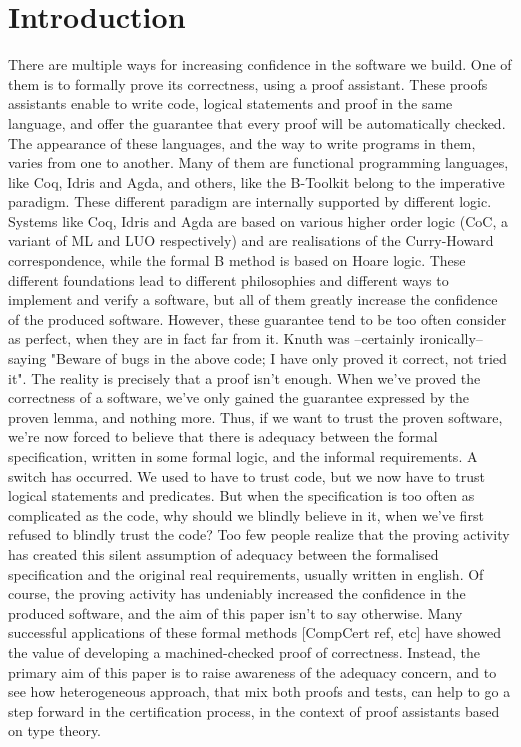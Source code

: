 \section{Introduction}

There are multiple ways for increasing confidence in the software we build. One of them is to formally prove its correctness, using a proof assistant. These proofs assistants enable to write code, logical statements and proof in the same language, and offer the guarantee that every proof will be automatically checked. The appearance of these languages, and the way to write programs in them, varies from one to another. Many of them are functional programming languages, like Coq, Idris and Agda, and others, like the B-Toolkit belong to the imperative paradigm. These different paradigm are internally supported by different logic. Systems like Coq, Idris and Agda are based on various higher order logic (CoC, a variant of ML and LUO respectively) and are realisations of the Curry-Howard correspondence, while the formal B method is based on Hoare logic. These different foundations lead to different philosophies and different ways to implement and verify a software, but all of them greatly increase the confidence of the produced software. However, these guarantee tend to be too often consider as perfect, when they are in fact far from it. Knuth was --certainly ironically-- saying "Beware of bugs in the above code; I have only proved it correct, not tried it". The reality is precisely that a proof isn't enough. When we've proved the correctness of a software, we've only gained the guarantee expressed by the proven lemma, and nothing more. Thus, if we want to trust the proven software, we're now forced to believe that there is adequacy between the formal specification, written in some formal logic, and the informal requirements. A switch has occurred. We used to have to trust code, but we now have to trust logical statements and predicates. But when the specification is too often as complicated as the code, why should we blindly believe in it, when we've first refused to blindly trust the code? Too few people realize that the proving activity has created this silent assumption of adequacy between the formalised specification and the original real requirements, usually written in english. Of course, the proving activity has undeniably increased the confidence in the produced software, and the aim of this paper isn't to say otherwise. Many successful applications of these formal methods [CompCert ref, etc] have showed the value of developing a machined-checked proof of correctness. Instead, the primary aim of this paper is to raise awareness of the adequacy concern, and to see how heterogeneous approach, that mix both proofs and tests, can help to go a step forward in the certification process, in the context of proof assistants based on type theory.
